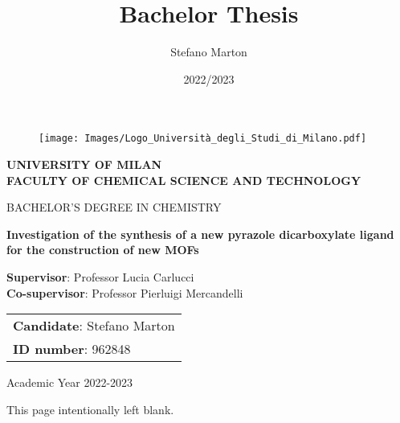 \documentclass[a4,11pt,openright]{report}
\title{Bachelor Thesis}
\author{Stefano Marton}
\date{2022/2023}
\makeatletter
\def\cleardoublepage{\clearpage%
	\if@twoside
		\ifodd\c@page\else
			\vspace*{\fill}
			\hfill
			\begin{center}
				This page intentionally left blank.
			\end{center}
			\vspace{\fill}
			\thispagestyle{empty}
			\newpage
			\if@twocolumn\hbox{}\newpage\fi
		\fi
	\fi
}
\makeatother
\begin{document}
\begin{titlepage}
	\begin{figure}[h]
		\centering
		\texttt{[image: Images/Logo\_Università\_degli\_Studi\_di\_Milano.pdf]}
	\end{figure}
	\centering \Large
	\textbf{UNIVERSITY OF MILAN}\\
	\textbf{FACULTY OF CHEMICAL SCIENCE AND TECHNOLOGY}

	BACHELOR'S DEGREE IN CHEMISTRY
	\begin{center}
		\vspace*{2cm}
		\LARGE
		\textbf{Investigation of the synthesis of a new pyrazole dicarboxylate ligand for the construction of new MOFs}
	\end{center}
	\vspace*{2.6cm}
	\begin{flushleft}
		\fontsize{12.5}\selectfont \textbf{\fontsize{12.5}\selectfont Supervisor}: Professor Lucia Carlucci\\
		\fontsize{12.5}\selectfont \textbf{\fontsize{12.5}\selectfont Co-supervisor}: Professor Pierluigi Mercandelli \\
	\end{flushleft}
	\vspace*{1.3cm}
	\begin{flushright}
		\begin{tabular}{l}
			\fontsize{12.5}\selectfont \textbf{\fontsize{12.5}\selectfont Candidate}: Stefano Marton \\
			\fontsize{12.5}\selectfont \textbf{\fontsize{12.5}\selectfont ID number}: 962848
		\end{tabular}
	\end{flushright}
	\vspace{2cm}
	\begin{center}
		\fontsize{12.5}\selectfont Academic Year 2022-2023
	\end{center}
	\vspace*{\fill}
\end{titlepage}

\afterpage{\blankpage}
\cleardoublepage
\end{document}
